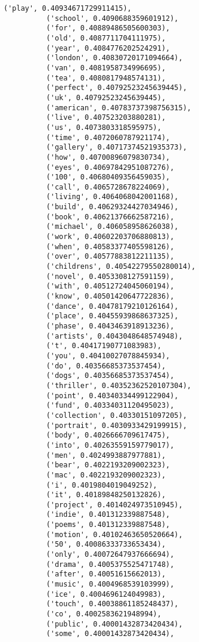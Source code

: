 \documentclass[11pt]{article}
\begin{document}
\begin{Verbatim}[commandchars=\\\{\}]
          ('play', 0.40934671729911415),
          ('school', 0.4090688359601912),
          ('for', 0.40889486505600303),
          ('old', 0.4087711704111975),
          ('year', 0.4084776202524291),
          ('london', 0.40830720171094664),
          ('van', 0.4081958734996695),
          ('tea', 0.4080817948574131),
          ('perfect', 0.40792523245639445),
          ('uk', 0.40792523245639445),
          ('american', 0.40783737398756315),
          ('live', 0.407523203880281),
          ('us', 0.4073803318595975),
          ('time', 0.4072060787921174),
          ('gallery', 0.40717374521935373),
          ('how', 0.40700896079830734),
          ('eyes', 0.40697842951087276),
          ('100', 0.40680409356459035),
          ('call', 0.4065728678224069),
          ('living', 0.4064068042001168),
          ('build', 0.40629324427034946),
          ('book', 0.40621376662587216),
          ('michael', 0.406058958626038),
          ('work', 0.40602203706880813),
          ('when', 0.40583377405598126),
          ('over', 0.40577883812211135),
          ('childrens', 0.40542279550280014),
          ('novel', 0.4053308127591159),
          ('with', 0.40512724045060194),
          ('know', 0.40501420647722836),
          ('dance', 0.40478179210126164),
          ('place', 0.40455939868637325),
          ('phase', 0.4043463918913236),
          ('artists', 0.4043048648574948),
          ('t', 0.40417190771083983),
          ('you', 0.40410027078845934),
          ('do', 0.40356685373537454),
          ('dogs', 0.40356685373537454),
          ('thriller', 0.40352362520107304),
          ('point', 0.40340334499122904),
          ('fund', 0.40334031120495023),
          ('collection', 0.40330151097205),
          ('portrait', 0.4030933429199915),
          ('body', 0.4026666709617475),
          ('into', 0.40263559159779017),
          ('men', 0.4024993887977881),
          ('bear', 0.4022193209002323),
          ('mac', 0.4022193209002323),
          ('i', 0.4019804019049252),
          ('it', 0.40189848250132826),
          ('project', 0.4014024973510945),
          ('indie', 0.401312339887548),
          ('poems', 0.401312339887548),
          ('motion', 0.40102463650520664),
          ('50', 0.40086333733653434),
          ('only', 0.40072647937666694),
          ('drama', 0.4005375525471748),
          ('after', 0.40051615662013),
          ('music', 0.4004968539103999),
          ('ice', 0.4004696124049983),
          ('touch', 0.40038861185248437),
          ('co', 0.4002583621948994),
          ('public', 0.40001432873420434),
          ('some', 0.40001432873420434),

\end{Verbatim}
\end{document}
